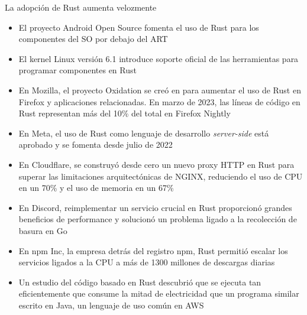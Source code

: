 \documentclass{beamer}
\begin{document}
\begin{frame}{La adopción de Rust aumenta velozmente}
  \scriptsize
  \begin{itemize}
    \item El proyecto Android Open Source fomenta
          el uso de Rust para los componentes del SO
          por debajo del ART \cite{stoep2021}
    \item El kernel Linux versión 6.1 introduce soporte oficial de las herramientas
          para programar componentes en Rust \cite{corbet2022,desimone2022}
    \item En Mozilla, el proyecto Oxidation se creó en 
          para aumentar el uso de Rust en Firefox y aplicaciones relacionadas. 
          En marzo de 2023, las líneas de código en Rust representan
          más del 10\% del total en Firefox Nightly \cite{mozilla-oxidation}
    \item En Meta, el uso de Rust como lenguaje de desarrollo \emph{server-side}
          está aprobado y se fomenta desde julio de 2022 \cite{garcia2022}
    \item En Cloudflare, se construyó desde cero un nuevo proxy HTTP en Rust
          para superar las limitaciones arquitectónicas de NGINX,
          reduciendo el uso de CPU en un 70\% y el uso de memoria en un 67\% \cite{wu2022}
    \item En Discord, reimplementar un servicio crucial
          en Rust proporcionó grandes beneficios de performance
          y solucionó un problema ligado a la recolección de basura en Go \cite{howarth2020}
    \item En npm Inc, la empresa detrás del registro npm,
          Rust permitió escalar los servicios ligados a la CPU
          a más de 1300 millones de descargas diarias \cite{rust-npm-case-study}
    \item Un estudio del código basado en Rust descubrió que se ejecuta tan eficientemente
          que consume la mitad de electricidad que un programa similar escrito en Java,
          un lenguaje de uso común en AWS \cite{pereira2017energy}
  \end{itemize}
\end{frame}
\end{document}

